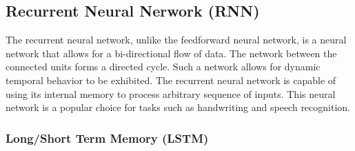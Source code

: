 \subsection{Recurrent Neural Nerwork (RNN)}
The recurrent neural network, unlike the feedforward neural network, is a neural network that allows for a bi-directional flow of data. 
The network between the connected units forms a directed cycle.
Such a network allows for dynamic temporal behavior to be exhibited.
The recurrent neural network is capable of using its internal memory to process arbitrary sequence of inputs.
This neural network is a popular choice for tasks such as handwriting and speech recognition.

\subsubsection{Long/Short Term Memory (LSTM)}
